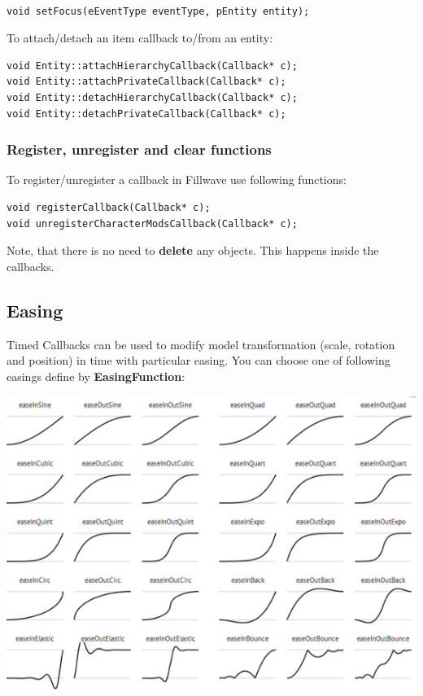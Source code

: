 \documentclass{article}
\begin{document}
\begin{lstlisting}

void setFocus(eEventType eventType, pEntity entity);

\end{lstlisting}
   
\indent \indent To attach/detach an item callback to/from an entity:

\begin{lstlisting}
void Entity::attachHierarchyCallback(Callback* c);
void Entity::attachPrivateCallback(Callback* c);
void Entity::detachHierarchyCallback(Callback* c);
void Entity::detachPrivateCallback(Callback* c);
\end{lstlisting}

\subsubsection{Register, unregister and clear functions}\label{sec:register functions}
\indent \indent To register/unregister a callback in Fillwave use following functions:

\begin{lstlisting}
void registerCallback(Callback* c);
void unregisterCharacterModsCallback(Callback* c);
\end{lstlisting}

\indent \indent Note, that there is no need to \textbf{delete} any objects. This happens inside the callbacks.

\newpage

\subsection{Easing}\label{sec:Easing}

\indent \indent Timed Callbacks can be used to modify model transformation (scale, rotation and position) in time with particular easing. You can choose one of following easings define by \textbf{EasingFunction}:

\begin{center}

\includegraphics[scale=0.6]{easing.png}

\end{center}
\end{document}
